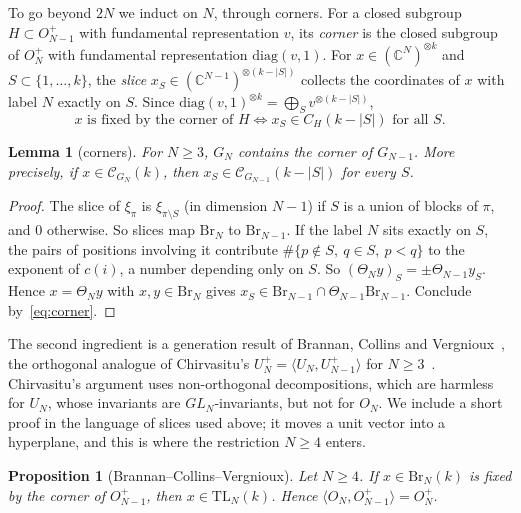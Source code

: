 \documentclass[11pt]{amsart}
\newtheorem{proposition}[theorem]{Proposition}
\newtheorem{lemma}[theorem]{Lemma}
\theoremstyle{definition}
\theoremstyle{remark}
\theoremstyle{plain}
\numberwithin{equation}{section}
\numberwithin{table}{section}
\newcommand{\C}{\mathbb C}
\newcommand{\TL}{\mathrm{TL}}
\newcommand{\Br}{\mathrm{Br}}
\begin{document}
To go beyond $2N$ we induct on $N$, through corners. For a closed subgroup $H\subset O_{N-1}^+$ with fundamental
representation $v$, its \emph{corner} is the closed subgroup of $O_N^+$ with fundamental representation $\mathrm{diag}(v,1)$.
For $x\in(\C^N)^{\otimes k}$ and $S\subset\{1,\dots,k\}$, the \emph{slice} $x_S\in(\C^{N-1})^{\otimes(k-|S|)}$ collects the
coordinates of $x$ with label $N$ exactly on $S$. Since $\mathrm{diag}(v,1)^{\otimes k}=\bigoplus_Sv^{\otimes(k-|S|)}$,
\begin{equation}\label{eq:corner}
x\text{ is fixed by the corner of }H\iff x_S\in C_H(k-|S|)\text{ for all }S.
\end{equation}

\begin{lemma}[corners]\label{lem:corner}
For $N\ge3$, $G_N$ contains the corner of $G_{N-1}$. More precisely, if $x\in \mathcal C_{G_N}(k)$, then $x_S\in \mathcal C_{G_{N-1}}(k-|S|)$
for every $S$.
\end{lemma}

\begin{proof}
The slice of $\xi_\pi$ is $\xi_{\pi\setminus S}$ (in dimension $N-1$) if $S$ is a union of blocks of $\pi$, and $0$ otherwise.
So slices map $\Br_N$ to $\Br_{N-1}$. If the label $N$ sits exactly on $S$, the pairs of positions involving it contribute
$\#\{p\notin S,\ q\in S,\ p<q\}$ to the exponent of $c(i)$, a number depending only on $S$. So $(\Theta_Ny)_S=\pm\Theta_{N-1}y_S$.
Hence $x=\Theta_Ny$ with $x,y\in\Br_N$ gives $x_S\in\Br_{N-1}\cap\Theta_{N-1}\Br_{N-1}$. Conclude by~\eqref{eq:corner}.
\end{proof}

The second ingredient is a generation result of Brannan, Collins and Vergnioux~\cite[Thm.~4.1]{bcv}, the orthogonal
analogue of Chirvasitu's $U_N^+=\langle U_N,U_{N-1}^+\rangle$ for $N\ge3$~\cite{ch1,ch2}. Chirvasitu's argument uses
non-orthogonal decompositions, which are harmless for $U_N$, whose invariants are $GL_N$-invariants, but not for $O_N$.
We include a short proof in the language of slices used above; it moves a unit vector into a hyperplane, and this is
where the restriction $N\ge4$ enters.

\begin{proposition}[Brannan--Collins--Vergnioux]\label{prop:chir}
Let $N\ge4$. If $x\in\Br_N(k)$ is fixed by the corner of $O_{N-1}^+$, then $x\in\TL_N(k)$. Hence
$\langle O_N,O_{N-1}^+\rangle=O_N^+$.
\end{proposition}
\end{document}
